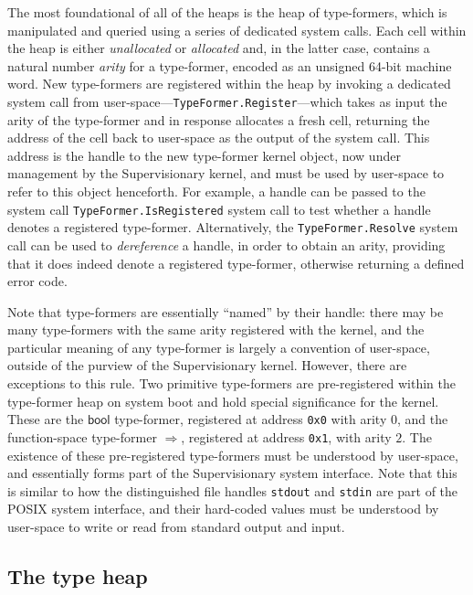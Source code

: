 \documentclass[a4paper, UKenglish, cleveref, autoref, thm-restate, colorlinks]{lipics-v2021}
\begin{document}
The most foundational of all of the heaps is the heap of type-formers, which is manipulated and queried using a series of dedicated system calls.
Each cell within the heap is either \emph{unallocated} or \emph{allocated} and, in the latter case, contains a natural number \emph{arity} for a type-former, encoded as an unsigned 64-bit machine word.
New type-formers are registered within the heap by invoking a dedicated system call from user-space---\texttt{TypeFormer.Register}---which takes as input the arity of the type-former and in response allocates a fresh cell, returning the address of the cell back to user-space as the output of the system call.
This address is the handle to the new type-former kernel object, now under management by the Supervisionary kernel, and must be used by user-space to refer to this object henceforth.
For example, a handle can be passed to the system call \texttt{TypeFormer.IsRegistered} system call to test whether a handle denotes a registered type-former.
Alternatively, the \texttt{TypeFormer.Resolve} system call can be used to \emph{dereference} a handle, in order to obtain an arity, providing that it does indeed denote a registered type-former, otherwise returning a defined error code.

Note that type-formers are essentially ``named'' by their handle: there may be many type-formers with the same arity registered with the kernel, and the particular meaning of any type-former is largely a convention of user-space, outside of the purview of the Supervisionary kernel.
However, there are exceptions to this rule.
Two primitive type-formers are pre-registered within the type-former heap on system boot and hold special significance for the kernel.
These are the $\mathsf{bool}$ type-former, registered at address \texttt{0x0} with arity $0$, and the function-space type-former $\Rightarrow$, registered at address \texttt{0x1}, with arity $2$.
The existence of these pre-registered type-formers must be understood by user-space, and essentially forms part of the Supervisionary system interface.
Note that this is similar to how the distinguished file handles \texttt{stdout} and \texttt{stdin} are part of the POSIX system interface, and their hard-coded values must be understood by user-space to write or read from standard output and input.

\subsection{The type heap}
\end{document}
